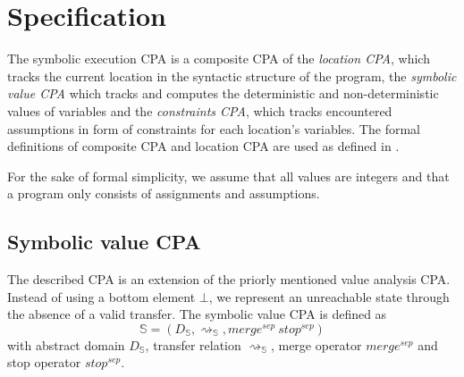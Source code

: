 \newcommand{\symex}{\mathbb{S}}

\newcommand{\constraints}{\mathbb{C}}
\newcommand{\location}{\mathbb{L}}
\newcommand{\composition}{\mathscr{C}}

\newcommand{\transfer}{\rightsquigarrow}
\newcommand{\gtransfer}{\overset{g}{\transfer}}
\newcommand{\strengthen}{\downarrow}

\newcommand{\valueset}{\mathscr{Z}}
\newcommand{\integerset}{\mathbb{Z}}

\newcommand{\symlattice}{\mathscr{E}}
\newcommand{\symidset}{S_I}
\newcommand{\symexpset}{S_E}

\newcommand{\constraintlattice}{\mathscr{C}}

\newcommand{\llbracket}{[\![}
\newcommand{\rrbracket}{]\!]}
\newcommand{\concretization}{\llbracket \cdot \rrbracket}
\newcommand{\lesserEqual}{\sqsubseteq}
\newcommand{\leastupperbound}{\sqcup}

\newcommand{\satisfies}{\vDash}

\section{Specification}
The symbolic execution CPA is a composite CPA of the \emph{location CPA}, which tracks the current location in the syntactic structure of the program, the \emph{symbolic value CPA} which tracks and computes the deterministic and non-deterministic values of variables and the \emph{constraints CPA}, which tracks encountered assumptions in form of constraints for each location's variables. The formal definitions of composite CPA and location CPA are used as defined in \cite{Beyer2007}.

For the sake of formal simplicity, we assume that all values are integers and that a program only consists of assignments and assumptions.

\subsection{Symbolic value CPA}
The described CPA is an extension of the priorly mentioned value analysis CPA.
Instead of using a bottom element $\bot$, we represent an unreachable state through the absence of a valid transfer.
The symbolic value CPA is defined as
\[\symex = (D_\symex, \transfer_\symex, merge^{sep}\ stop^{sep})\]
with abstract domain $D_\symex$, transfer relation $\transfer_\symex$, merge operator $merge^{sep}$ and stop operator $stop^{sep}$.

